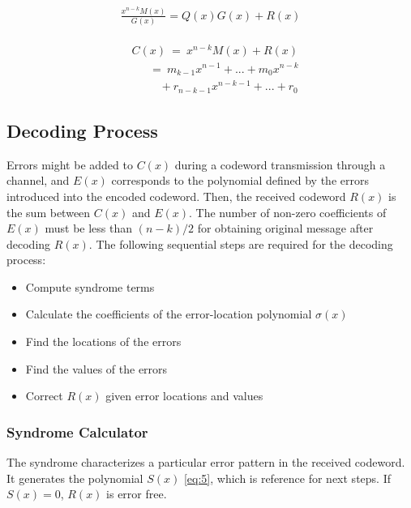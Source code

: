 \documentclass[conference]{IEEEtran}
\begin{document}
\begin{align}
\label{eq:3}
\begin{gathered}
\frac{x^{n - k}M(x)}{G(x)}  = Q(x)G(x) + R(x)
\end{gathered}
\end{align}

\begin{equation}
\label{eq:4}
\begin{aligned}
& C(x)\ =\ x^{n - k}M(x) + R(x)\\
& \ \ \ \ \ \ \ =\ m_{k-1}x^{n-1} + ... + m_0x^{n-k} \\
& \ \ \ \ \ \ \ \ \ \ \ + r_{n-k-1}x^{n-k-1}+...+r_0
\end{aligned}
\end{equation}

\subsection{Decoding Process} 

	\par Errors might be added to $C(x)$ during a codeword transmission through a channel, and $E(x)$ corresponds to the polynomial defined by the errors introduced into the encoded codeword. Then, the received codeword $R(x)$ is the sum between $C(x)$ and $E(x)$. The number of non-zero coefficients of $E(x)$ must be less than $(n - k)/2$ for obtaining original message after decoding $R(x)$. The following sequential steps are required for the decoding process:
	
\begin{itemize}
	\item Compute syndrome terms
	\item Calculate the coefficients of the error-location polynomial $\sigma (x)$
	\item Find the locations of the errors
	\item Find the values of the errors
	\item Correct $R(x)$ given error locations and values 
\end{itemize}
\hfill \break
\subsubsection{Syndrome Calculator}
\par The syndrome characterizes a particular error pattern in the received codeword. It generates the polynomial $S(x)$ \eqref{eq:5}, which is reference for next steps. If $S(x) = 0$, $R(x)$ is error free. 
\end{document}
